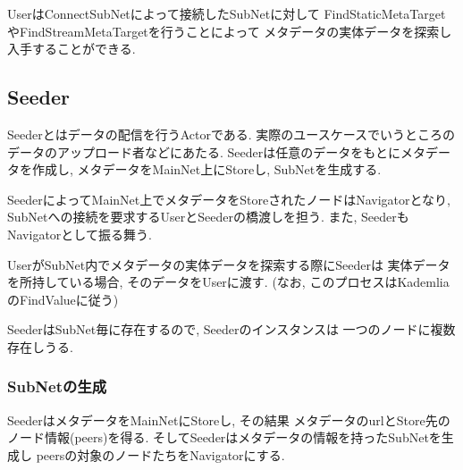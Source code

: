 \documentclass[sotsuron]{jcsie}
\begin{document}
UserはConnectSubNetによって接続したSubNetに対して
FindStaticMetaTargetやFindStreamMetaTargetを行うことによって
メタデータの実体データを探索し入手することができる.

\subsection{Seeder}
Seederとはデータの配信を行うActorである.
実際のユースケースでいうところのデータのアップロード者などにあたる.
Seederは任意のデータをもとにメタデータを作成し, 
メタデータをMainNet上にStoreし, SubNetを生成する.

SeederによってMainNet上でメタデータをStoreされたノードはNavigatorとなり, 
SubNetへの接続を要求するUserとSeederの橋渡しを担う.
また, SeederもNavigatorとして振る舞う.

UserがSubNet内でメタデータの実体データを探索する際にSeederは
実体データを所持している場合, そのデータをUserに渡す.
(なお, このプロセスはKademliaのFindValueに従う)

SeederはSubNet毎に存在するので, Seederのインスタンスは
一つのノードに複数存在しうる.

\subsubsection{SubNetの生成}
SeederはメタデータをMainNetにStoreし, その結果
メタデータのurlとStore先のノード情報(peers)を得る.
そしてSeederはメタデータの情報を持ったSubNetを生成し
peersの対象のノードたちをNavigatorにする.
\end{document}
